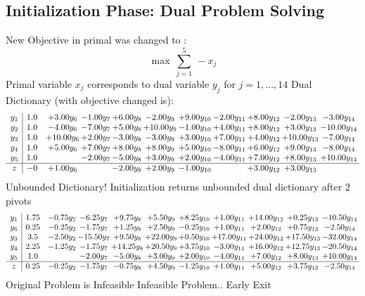 \documentclass[9pt]{article}
\begin{document}
\subsection{Initialization Phase: Dual Problem Solving}
New Objective in primal was changed to : \[ \max\ \sum_{j=1}^{5}\ - x_j \] 
Primal variable $x_j$ corresponds to dual variable $y_j$ for $j = 1,\ldots,14$
Dual Dictionary (with objective changed is): 
\[\begin{array}{c| c c@{\hskip 2pt} c@{\hskip 2pt} c@{\hskip 2pt} c@{\hskip 2pt} c@{\hskip 2pt} c@{\hskip 2pt} c@{\hskip 2pt} c@{\hskip 2pt} c@{\hskip 2pt} }
 y_{1}   &  1.0 & +  3.00 y_{6} & -1.00 y_{7} & +  6.00 y_{8} & -2.00 y_{9} & +  9.00 y_{10} & -2.00 y_{11} & +  8.00 y_{12} & -2.00 y_{13} & -3.00 y_{14}\\
 y_{2}   &  1.0 & -4.00 y_{6} & -7.00 y_{7} & +  5.00 y_{8} & + 10.00 y_{9} & -1.00 y_{10} & +  4.00 y_{11} & +  8.00 y_{12} & +  3.00 y_{13} & -10.00 y_{14}\\
 y_{3}   &  1.0 & + 10.00 y_{6} & +  2.00 y_{7} & -3.00 y_{8} & -3.00 y_{9} & +  3.00 y_{10} & +  7.00 y_{11} & +  4.00 y_{12} & + 10.00 y_{13} & -7.00 y_{14}\\
 y_{4}   &  1.0 & +  5.00 y_{6} & +  7.00 y_{7} & +  8.00 y_{8} & +  8.00 y_{9} & +  5.00 y_{10} & -8.00 y_{11} & +  6.00 y_{12} & +  9.00 y_{13} & -8.00 y_{14}\\
 y_{5}   &  1.0  &   & -2.00 y_{7} & -5.00 y_{8} & +  3.00 y_{9} & +  2.00 y_{10} & -4.00 y_{11} & +  7.00 y_{12} & +  8.00 y_{13} & + 10.00 y_{14}\\
\hline
z    &  -0 & +  1.00 y_{6} &   & -2.00 y_{8} & +  2.00 y_{9} & -1.00 y_{10} &   & +  3.00 y_{12} & +  3.00 y_{13} &   \\
\end{array}\]
Unbounded Dictionary!
Initialization returns unbounded dual dictionary after 2 pivots
\[\begin{array}{c| c c@{\hskip 2pt} c@{\hskip 2pt} c@{\hskip 2pt} c@{\hskip 2pt} c@{\hskip 2pt} c@{\hskip 2pt} c@{\hskip 2pt} c@{\hskip 2pt} c@{\hskip 2pt} }
 y_{1}   &  1.75 & -0.75 y_{2} & -6.25 y_{7} & +  9.75 y_{8} & +  5.50 y_{9} & +  8.25 y_{10} & +  1.00 y_{11} & + 14.00 y_{12} & +  0.25 y_{13} & -10.50 y_{14}\\
 y_{6}   &  0.25 & -0.25 y_{2} & -1.75 y_{7} & +  1.25 y_{8} & +  2.50 y_{9} & -0.25 y_{10} & +  1.00 y_{11} & +  2.00 y_{12} & +  0.75 y_{13} & -2.50 y_{14}\\
 y_{3}   &  3.5 & -2.50 y_{2} & -15.50 y_{7} & +  9.50 y_{8} & + 22.00 y_{9} & +  0.50 y_{10} & + 17.00 y_{11} & + 24.00 y_{12} & + 17.50 y_{13} & -32.00 y_{14}\\
 y_{4}   &  2.25 & -1.25 y_{2} & -1.75 y_{7} & + 14.25 y_{8} & + 20.50 y_{9} & +  3.75 y_{10} & -3.00 y_{11} & + 16.00 y_{12} & + 12.75 y_{13} & -20.50 y_{14}\\
 y_{5}   &  1.0  &   & -2.00 y_{7} & -5.00 y_{8} & +  3.00 y_{9} & +  2.00 y_{10} & -4.00 y_{11} & +  7.00 y_{12} & +  8.00 y_{13} & + 10.00 y_{14}\\
\hline
z    &  0.25 & -0.25 y_{2} & -1.75 y_{7} & -0.75 y_{8} & +  4.50 y_{9} & -1.25 y_{10} & +  1.00 y_{11} & +  5.00 y_{12} & +  3.75 y_{13} & -2.50 y_{14}\\
\end{array}\]
Original Problem is Infeasible
Infeasible Problem.. Early Exit
\end{document}
